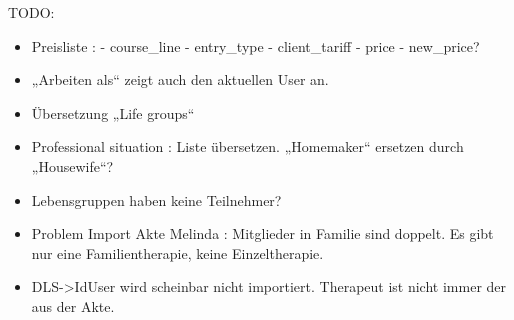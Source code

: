 \documentclass[letterpaper,10pt,ngerman]{sphinxmanual}
\begin{document}
TODO:
\begin{itemize}
\item {} 
Preisliste :
- course\_line
- entry\_type
- client\_tariff
- price
- new\_price?

\item {} 
„Arbeiten als“  zeigt auch den aktuellen User an.

\item {} 
Übersetzung „Life groups“

\item {} 
Professional situation : Liste übersetzen. „Homemaker“ ersetzen
durch „Housewife“?

\item {} 
Lebensgruppen haben keine Teilnehmer?

\item {} 
Problem Import Akte Melinda : Mitglieder in Familie sind doppelt. Es
gibt nur eine Familientherapie, keine Einzeltherapie.

\item {} 
DLS-\textgreater{}IdUser wird scheinbar nicht importiert. Therapeut ist nicht
immer der aus der Akte.

\end{itemize}
\end{document}

